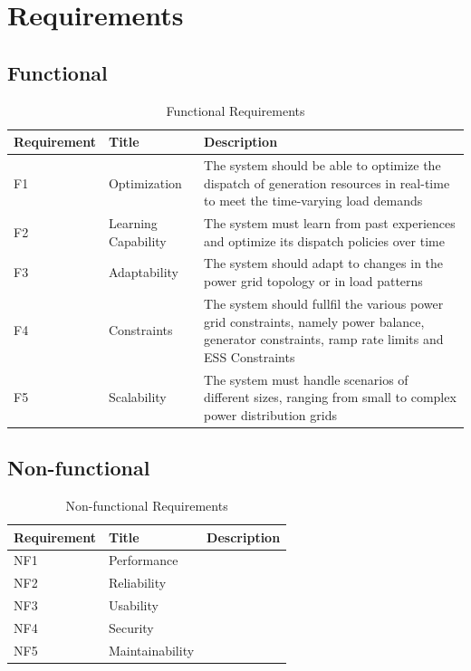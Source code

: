 \section{Requirements}

\subsection{Functional}

\begin{table}[h!]
	\centering
	\caption{Functional Requirements}
	\begin{tabular}{|P{2cm}|P{4cm}|p{6cm}|  }
		\hline
		\textbf{Requirement} & \textbf{Title} & \textbf{Description} \\
		\hline
		F1 & Optimization & The system should be able to optimize the dispatch of generation resources in real-time to meet the time-varying load demands \\
		\hline
		F2 & Learning Capability & The system must learn from past experiences and optimize its dispatch policies over time \\
		\hline
		F3 & Adaptability & The system should adapt to changes in the power grid topology or in load patterns \\
		\hline
		F4 & Constraints & The system should fullfil the various power grid constraints, namely power balance, generator constraints, ramp rate limits and \ac{ESS} Constraints \\
		\hline
		F5 & Scalability & The system must handle scenarios of different sizes, ranging from small to complex power distribution grids \\
		\hline
	\end{tabular}
\end{table}

\subsection{Non-functional}

\begin{table}[h!]
	\centering
	\caption{Non-functional Requirements}
	\begin{tabular}{|P{2cm}|P{4cm}|p{6cm}|  }
		\hline
		\textbf{Requirement} & \textbf{Title} & \textbf{Description} \\
		\hline
		NF1 & Performance & \\
		\hline
		NF2 & Reliability & \\
		\hline
		NF3 & Usability & \\
		\hline
		NF4 & Security & \\
		\hline
		NF5 & Maintainability & \\
		\hline
		
		\hline
	\end{tabular}
\end{table}

